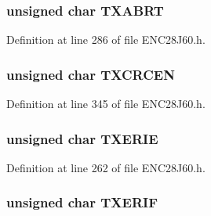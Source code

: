\hypertarget{union___r_e_g_a669738c9a81f145eb08b8c2377690a8e}{}
\subsubsection[{T\+X\+A\+B\+R\+T}]{\setlength{\rightskip}{0pt plus 5cm}unsigned {\bf char} T\+X\+A\+B\+R\+T}\label{union___r_e_g_a669738c9a81f145eb08b8c2377690a8e}


Definition at line 286 of file E\+N\+C28\+J60.\+h.

\hypertarget{union___r_e_g_a4fcf256f46c72d4467f1a17ca98e671c}{}
\subsubsection[{T\+X\+C\+R\+C\+E\+N}]{\setlength{\rightskip}{0pt plus 5cm}unsigned {\bf char} T\+X\+C\+R\+C\+E\+N}\label{union___r_e_g_a4fcf256f46c72d4467f1a17ca98e671c}


Definition at line 345 of file E\+N\+C28\+J60.\+h.

\hypertarget{union___r_e_g_a67263429abcf3d30708255e69c711789}{}
\subsubsection[{T\+X\+E\+R\+I\+E}]{\setlength{\rightskip}{0pt plus 5cm}unsigned {\bf char} T\+X\+E\+R\+I\+E}\label{union___r_e_g_a67263429abcf3d30708255e69c711789}


Definition at line 262 of file E\+N\+C28\+J60.\+h.

\hypertarget{union___r_e_g_a7e5be7a874e8019cdb1c70b5982ec898}{}
\subsubsection[{T\+X\+E\+R\+I\+F}]{\setlength{\rightskip}{0pt plus 5cm}unsigned {\bf char} T\+X\+E\+R\+I\+F}\label{union___r_e_g_a7e5be7a874e8019cdb1c70b5982ec898}


